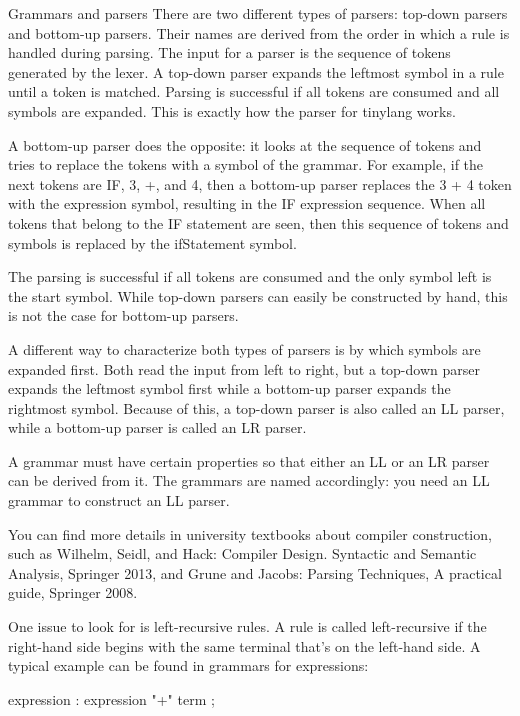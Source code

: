 \begin{myTip}{Grammars and parsers}
There are two different types of parsers: top-down parsers and bottom-up parsers. Their names are derived from the order in which a rule is handled during parsing. The input for a parser is the sequence of tokens generated by the lexer.
A top-down parser expands the leftmost symbol in a rule until a token is matched. Parsing is successful if all tokens are consumed and all symbols are expanded. This is exactly how the parser for tinylang works.

A bottom-up parser does the opposite: it looks at the sequence of tokens and tries to replace the tokens with a symbol of the grammar. For example, if the next tokens are IF, 3, +, and 4, then a bottom-up parser replaces the 3 + 4 token with the expression symbol, resulting in the IF expression sequence. When all tokens that belong to the IF statement are seen, then this sequence of tokens and symbols is replaced by the ifStatement symbol.

The parsing is successful if all tokens are consumed and the only symbol left is the start symbol. While top-down parsers can easily be constructed by hand, this is not the case for bottom-up parsers.

A different way to characterize both types of parsers is by which symbols are expanded first. Both read the input from left to right, but a top-down parser expands the leftmost symbol first while a bottom-up parser expands the rightmost symbol. Because of this, a top-down parser is also called an LL parser, while a bottom-up parser is called an LR parser.

A grammar must have certain properties so that either an LL or an LR parser can be derived from it. The grammars are named accordingly: you need an LL grammar to construct an LL parser.

You can find more details in university textbooks about compiler construction, such as Wilhelm, Seidl, and Hack: Compiler Design. Syntactic and Semantic Analysis, Springer 2013, and Grune and Jacobs: Parsing Techniques, A practical guide, Springer 2008.
\end{myTip}

One issue to look for is left-recursive rules. A rule is called left-recursive if the right-hand side begins with the same terminal that’s on the left-hand side. A typical example can be found in grammars for expressions:

\begin{shell}
expression : expression "+" term ;
\end{shell}

